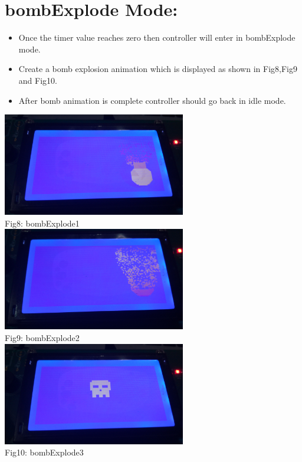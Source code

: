 \documentclass{article}
\begin{document}
\section{bombExplode Mode:}
\begin{itemize}
    \item Once the timer value reaches zero then controller will enter in bombExplode mode.
    \item Create a bomb explosion animation which is displayed as shown in Fig8,Fig9 and Fig10. 
    \item After bomb animation is complete controller should go back in idle mode.
\end{itemize}
\begin{center}
   \includegraphics[width=8cm]{bombExplode1}
   \\Fig8: bombExplode1
   \\[2\baselineskip]
   \includegraphics[width=8cm]{bombExplode2}
   \\Fig9: bombExplode2
   \\[2\baselineskip]
    \includegraphics[width=8cm]{bombExplode3}
   \\Fig10: bombExplode3
   \\[2\baselineskip]
 \end{center}
\end{document}

